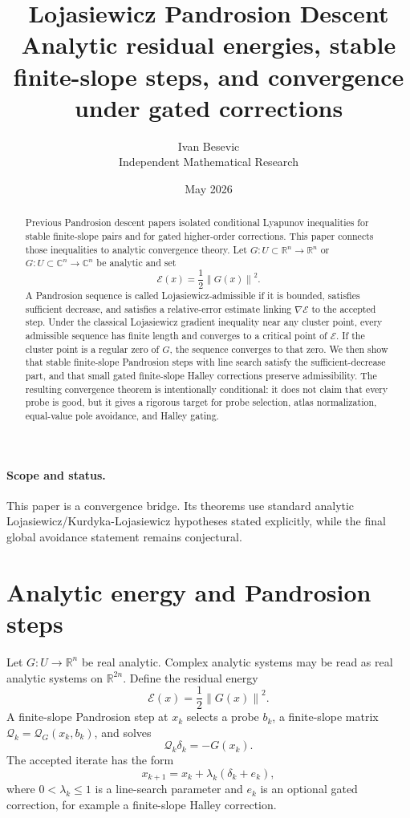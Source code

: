 \documentclass[11pt]{article}
\title{Lojasiewicz Pandrosion Descent\\[3pt]
\large Analytic residual energies, stable finite-slope steps, and convergence under gated corrections}
\author{Ivan Besevic\\Independent Mathematical Research}
\date{May 2026}
\newcommand{\C}{\mathbb C}
\newcommand{\R}{\mathbb R}
\newcommand{\E}{\mathcal E}
\newcommand{\Q}{\mathcal Q}
\newcommand{\norm}[1]{\left\lVert #1\right\rVert}
\begin{document}
\maketitle

\begin{abstract}
Previous Pandrosion descent papers isolated conditional Lyapunov inequalities for stable finite-slope pairs and for gated higher-order corrections. This paper connects those inequalities to analytic convergence theory. Let \(G:U\subset\R^n\to\R^n\) or \(G:U\subset\C^n\to\C^n\) be analytic and set
\[
        \E(x)=\frac12\norm{G(x)}^2.
\]
A Pandrosion sequence is called Lojasiewicz-admissible if it is bounded, satisfies sufficient decrease, and satisfies a relative-error estimate linking \(\nabla \E\) to the accepted step. Under the classical Lojasiewicz gradient inequality near any cluster point, every admissible sequence has finite length and converges to a critical point of \(\E\). If the cluster point is a regular zero of \(G\), the sequence converges to that zero. We then show that stable finite-slope Pandrosion steps with line search satisfy the sufficient-decrease part, and that small gated finite-slope Halley corrections preserve admissibility. The resulting convergence theorem is intentionally conditional: it does not claim that every probe is good, but it gives a rigorous target for probe selection, atlas normalization, equal-value pole avoidance, and Halley gating.
\end{abstract}

\paragraph{Scope and status.}
This paper is a convergence bridge. Its theorems use standard analytic Lojasiewicz/Kurdyka-Lojasiewicz hypotheses stated explicitly, while the final global avoidance statement remains conjectural.

\section{Analytic energy and Pandrosion steps}

Let \(G:U\to\R^n\) be real analytic. Complex analytic systems may be read as real analytic systems on \(\R^{2n}\). Define the residual energy
\[
        \E(x)=\frac12\norm{G(x)}^2.
\]
A finite-slope Pandrosion step at \(x_k\) selects a probe \(b_k\), a finite-slope matrix \(\Q_k=\Q_G(x_k,b_k)\), and solves
\[
        \Q_k\delta_k=-G(x_k).
\]
The accepted iterate has the form
\[
        x_{k+1}=x_k+\lambda_k(\delta_k+e_k),
\]
where \(0<\lambda_k\le1\) is a line-search parameter and \(e_k\) is an optional gated correction, for example a finite-slope Halley correction.
\end{document}
